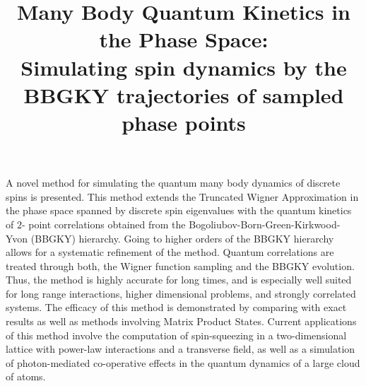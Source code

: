 \documentclass[extendedabs]{bmvc2k}
\begin{document}
\title{Many Body Quantum Kinetics in the Phase Space:\\
Simulating spin dynamics by the BBGKY trajectories of sampled phase points}
 
\maketitle


\noindent
A novel method for simulating the quantum many body dynamics of discrete spins is presented. This method extends the Truncated Wigner Approximation in the phase space
spanned by discrete spin eigenvalues with the quantum kinetics of $2$- point correlations obtained from the Bogoliubov-Born-Green-Kirkwood-Yvon (BBGKY) hierarchy. Going to higher orders of the BBGKY hierarchy allows for a systematic refinement of the method. Quantum correlations are treated through both, the Wigner function sampling and the BBGKY evolution. Thus, the method is highly accurate for long times, and is especially well suited for long range interactions, higher dimensional problems, and strongly correlated systems. The efficacy of this method is demonstrated by comparing with exact results as well as methods involving Matrix Product States. Current applications of this method involve the  computation of spin-squeezing in a two-dimensional lattice with power-law interactions and a transverse field, as well as a simulation of  photon-mediated co-operative effects in the quantum dynamics of a large cloud of atoms.
\end{document}
